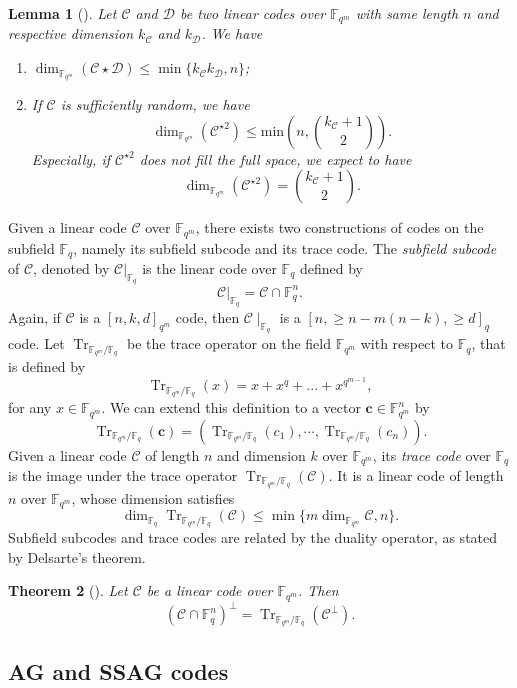 \documentclass[a4paper]{article}
\newtheorem{thm}{Theorem}[section]
\newtheorem{lemma}[thm]{Lemma}
\theoremstyle{definition}
\theoremstyle{remark}
\newcommand{\calC}{\mathcal{C}}
\newcommand{\calD}{\mathcal{D}}
\newcommand{\fqm}{\mathbb{F}_{q^m}}
\newcommand{\fq}{\mathbb{F}_{q}}
\newcommand{\Tr}[1]{\operatorname{Tr}_{\mathbb{F}_{q^m}/\fq}\left(#1\right)}
\begin{document}
\begin{lemma}[{\cite[Proposition~10]{MT21}}] \label{lem:known_bounds}
Let $\calC$ and $\calD$ be two linear codes over $\fqm$ with same length $n$ and respective dimension $k_{\calC}$ and $k_{\calD}$. We have
\begin{enumerate}
 \item $\dim_{\fqm}(\calC \star \calD) \leq \min\{k_{\calC}k_{\calD},n\}$;
 \item If $\calC$ is sufficiently random, we have
\[ \dim_{\mathbb{F}_{q^m}}(\calC^{\star2}) \leq \mathrm{min}\left(n,\binom{k_{\calC}+1}{2}\right) . \]
Especially, if $\calC^{\star2}$ does not fill the full space, we expect to have 
 \[ \dim_{\fqm}(\calC^{\star2}) = \binom{k_{\calC}+1}{2}.\]
 \end{enumerate}
\end{lemma}
Given a linear code $\calC$ over $\fqm$, there exists two constructions of codes on the subfield $\fq$, namely its subfield subcode and its trace code. The \emph{subfield subcode} of $\calC$, denoted by $\calC|_{\fq}$ is the linear code over $\fq$ defined by 
\[\calC|_{\fq}=\calC \cap \mathbb{F}_q^n.\]
Again, if $\calC$ is a $[n,k,d]_{q^m}$ code, then $\calC\mid_{\fq}$ is a $[n,\geq n-m(n-k),\geq d]_q$ code.
Let $\operatorname{Tr}_{\mathbb{F}_{q^m}/\fq}$ be the trace operator on the field $\mathbb{F}_{q^m}$ with respect to $\mathbb{F}_q$, that is defined by
\[\Tr{x} = x + x^q + ... + x^{q^{m-1}},\]
for any $x \in \fqm$. We can extend this definition to a vector $\mathbf{c} \in \fqm^n$ by $$\Tr{\mathbf{c}}= (\Tr{c_1},\cdots,\Tr{c_n}).$$ 
\noindent Given a linear code $\calC$ of length $n$ and dimension $k$ over $\fqm$, its \emph{trace code} over $\fq$ is the image under the trace operator $\Tr{\calC}$. It is a linear code of length $n$ over $\fqm$, whose dimension satisfies
\begin{equation}\label{eq:dim_trace}
\dim_{\mathbb{F}_q} \Tr{\calC} \leq \min\{m\dim_{\fqm} \calC,n\}.
\end{equation}
Subfield subcodes and trace codes are related by the duality operator, as stated by Delsarte's theorem.
\begin{thm}[{\cite[Delsarte's theorem]{Del75}}] \label{th:delsarte}
Let $\calC$ be a linear code over $\fqm$. Then
\[\left(\calC \cap \fq^n\right)^{\perp} = \Tr{\calC^{\perp}}.\]
\end{thm}
\subsection{AG and SSAG codes} \label{section:AG_codes}
\end{document}
